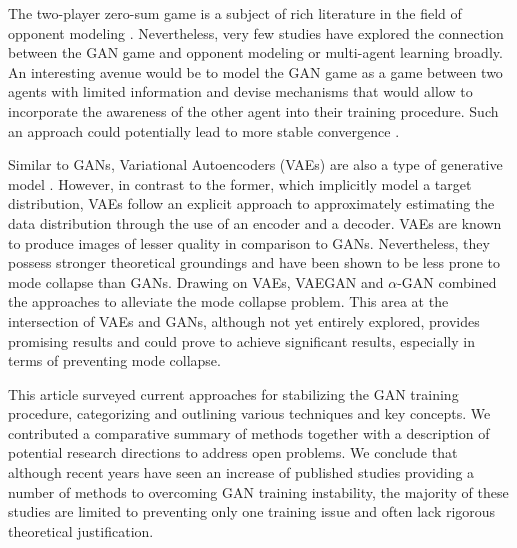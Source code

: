 The two-player zero-sum game is a subject of rich literature in the field of opponent modeling . Nevertheless, very few studies have explored the connection between the GAN game and opponent modeling or multi-agent learning broadly. An interesting avenue would be to model the GAN game as a game between two agents with limited information and devise mechanisms that would allow to incorporate the awareness of the other agent into their training procedure. Such an approach could potentially lead to more stable convergence .

Similar to GANs, Variational Autoencoders (VAEs) are also a type of generative model . However, in contrast to the former, which implicitly model a target distribution, VAEs follow an explicit approach to approximately estimating the data distribution through the use of an encoder and a decoder. VAEs are known to produce images of lesser quality in comparison to GANs. Nevertheless, they possess stronger theoretical groundings and have been shown to be less prone to mode collapse than GANs. Drawing on VAEs, VAEGAN  and $\alpha$-GAN  combined the approaches to alleviate the mode collapse problem. This area at the intersection of VAEs and GANs, although not yet entirely explored, provides promising results and could prove to achieve significant results, especially in terms of preventing mode collapse.

\label{sec:conc}
This article surveyed current approaches for stabilizing the GAN training procedure, categorizing and outlining various techniques and key concepts. We contributed a comparative summary of methods together with a description of potential research directions to address open problems. We conclude that although recent years have seen an increase of published studies providing a number of methods to overcoming GAN training instability, the majority of these studies are limited to preventing only one training issue and often lack rigorous theoretical justification.

